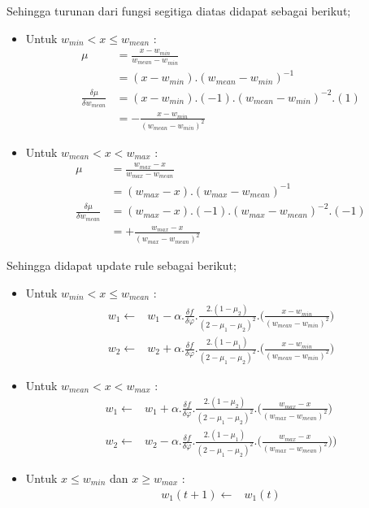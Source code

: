 Sehingga turunan dari fungsi segitiga diatas didapat sebagai berikut;
\begin{itemize}
  \item Untuk $w_{min} < x \leq w_{mean}$ :
  \begin{align}
	\label{eq:}
		\mu &= \frac{x - w_{min}}{w_{mean} - w_{min}} \nonumber \\
			&= (x - w_{min}) . (w_{mean} - w_{min})^{-1} \nonumber \\
		\frac{\delta \mu}{\delta w_{mean}} &=
		(x - w_{min}).(-1).(w_{mean} - w_{min})^{-2}.(1) \nonumber \\
		 &=
		- \frac{x - w_{min}}{(w_{mean} - w_{min})^2}
	\end{align}

	\item Untuk $w_{mean} < x < w_{max}$ :
	\begin{align}
	\label{eq:}
		\mu &= \frac{w_{max} - x}{w_{max} - w_{mean}} \nonumber \\
			&= (w_{max} - x) . (w_{max} - w_{mean})^{-1} \nonumber \\
		\frac{\delta \mu}{\delta w_{mean}} &=
		(w_{max} - x).(-1).(w_{max} - w_{mean})^{-2}.(-1) \nonumber \\
		 &=
		+ \frac{w_{max} - x}{(w_{max} - w_{mean})^2}
	\end{align}
\end{itemize}
  
\noindent Sehingga didapat update rule sebagai berikut;
\begin{itemize}
  \item Untuk $w_{min} < x \leq w_{mean}$ :
  	\begin{align}
	\label{eq:}
		w_1 \leftarrow & w_1 - \alpha .  
		\frac{\delta f}{\delta \varphi} . \frac{2.(1 - \mu_2)}{(2 - \mu_1 - \mu_2)^2}.
		\Bigg(\frac{x - w_{min}}{(w_{mean} - w_{min})^2}\Bigg) \\
		w_2 \leftarrow & w_2 + \alpha .  
		\frac{\delta f}{\delta \varphi} . \frac{2.(1 - \mu_1)}{(2 - \mu_1 - \mu_2)^2}.
		\Bigg(\frac{x - w_{min}}{(w_{mean} - w_{min})^2}\Bigg)
	\end{align}
  \item Untuk $w_{mean} < x < w_{max}$ :
	\begin{align}
	\label{eq:}
		w_1 \leftarrow & w_1 + \alpha .  
		\frac{\delta f}{\delta \varphi} . \frac{2.(1 - \mu_2)}{(2 - \mu_1 - \mu_2)^2}.
		\Bigg(\frac{w_{max} - x}{(w_{max} - w_{mean})^2}\Bigg) \\
		w_2 \leftarrow & w_2 - \alpha .  
		\frac{\delta f}{\delta \varphi} . \frac{2.(1 - \mu_1)}{(2 - \mu_1 - \mu_2)^2}.
		\Bigg(\frac{w_{max} - x}{(w_{max} - w_{mean})^2})\Bigg)
	\end{align}  
  \item Untuk $x \leq w_{min}$ dan $x \geq w_{max}$ :
  	\begin{align}
	\label{eq:}
		w_1(t+1) \leftarrow & w_1(t)     
	\end{align}  
\end{itemize}

